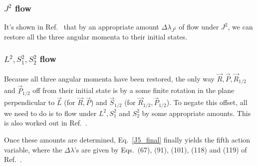 \subsubsection{$J^2$ flow}

It's shown in Ref.~\cite{tanay2021action} that by an appropriate amount
$\Delta \lambda_{J^2}$ of flow under $J^2$, we can restore all the three angular momenta to their initial states.


\subsubsection{$L^2, S_1^2, S_2^2$ flow}

Because all three angular momenta have been restored, the only
way $\vec{R}, \vec{P}, \vec{R}_{1/2}$ and $\vec{P}_{1/2}$ off from their 
initial state is by a some finite rotation in the plane perpendicular
to $\vec{L}$ (for $\vec{R}, \vec{P}$) 
and $\vec{S}_{1/2}$ (for $\vec{R}_{1/2}, \vec{P}_{1/2}$). To negate this offset,
all we need to do is to flow under $L^2, S_1^2$ and $S_2^2$ by some
appropriate amounts. This is also worked out in Ref.~\cite{tanay2021action}.






Once these amounts are determined, Eq.~\eqref{J5_final}
finally yields the fifth action variable, where the $\Delta \lambda$'s are 
given by Eqs.~(67), (91), (101), (118) and (119) of Ref.~\cite{tanay2021action}.





















